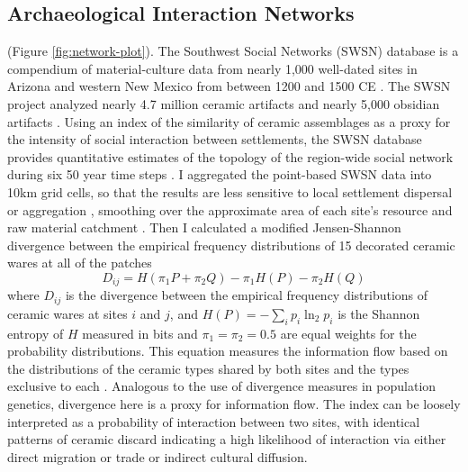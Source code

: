 \documentclass[10pt]{iopart}
\begin{document}
\subsection*{Archaeological Interaction Networks}
(Figure \ref{fig:network-plot}). The Southwest Social Networks (SWSN) database is a compendium of material-culture data from nearly 1,000 well-dated sites in Arizona and western New Mexico from between 1200 and 1500 CE \parencite{Mills2012,Mills2013a,Peeples2013,Borck2015,Hill2015,Mills2015a}. The SWSN project analyzed nearly 4.7 million ceramic artifacts and nearly 5,000 obsidian artifacts \parencite{Mills2015a}. Using an index of the similarity of ceramic assemblages as a proxy for the intensity of social interaction between settlements, the SWSN database provides quantitative estimates of the topology of the region-wide social network during six 50 year time steps \parencite{Mills2013a}. I aggregated the point-based SWSN data into 10km grid cells, so that the results are less sensitive to local settlement dispersal or aggregation \parencite{Paliou2016}, smoothing over the approximate area of each site's resource and raw material catchment \parencite{Varien1999}. Then I calculated a modified Jensen-Shannon divergence between the empirical frequency distributions of 15 decorated ceramic wares at all of the patches
\begin{equation}
    D_{ij} = H\left(\pi_1P + \pi_2Q\right) - \pi_1H(P) - \pi_2H(Q)
\end{equation}
where $D_{ij}$ is the divergence between the empirical frequency distributions of ceramic wares at sites $i$ and $j$, and $H(P) = -\sum_i p_i \ln_2 p_i$ is the Shannon entropy of $H$ measured in bits and $\pi_1 = \pi_2 = 0.5$ are equal weights for the probability distributions. This equation measures the information flow based on the distributions of the ceramic types shared by both sites and the types exclusive to each \parencite{Masucci2011,PaoloMasucci2012}. Analogous to the use of divergence measures in population genetics, divergence here is a proxy for information flow. The index can be loosely interpreted as a probability of interaction between two sites, with identical patterns of ceramic discard indicating a high likelihood of interaction via either direct migration or trade or indirect cultural diffusion.
\end{document}
